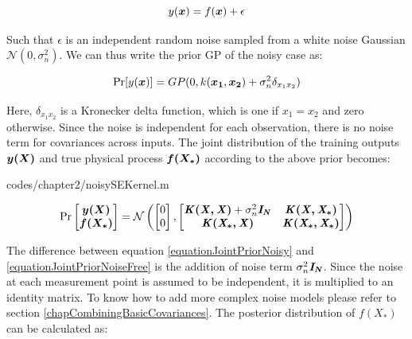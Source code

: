 \begin{equation}\label{eqNoiseEquation}
y(\boldsymbol{x}) = f(\boldsymbol{x}) + \epsilon
\end{equation}

Such that $\epsilon$ is an independent random noise sampled from a white noise Gaussian $\mathcal{N}(0, \sigma_{n}^{2})$. We can thus write the prior GP of the noisy case as:

\begin{equation}\label{equationMeanZeroGPNoisydefinition}
\Pr[y(\boldsymbol{x})] = GP(0 , k(\boldsymbol{x_1}, \boldsymbol{x_2}) + \sigma^{2}_{n}\delta_{x_{1}x_{2}})
\end{equation}

Here, $\delta_{x_{1}x_{2}}$ is a Kronecker delta function, which is one if $x_1 = x_2$ and zero otherwise. Since the noise is independent for each observation, there is no noise term for covariances across inputs. The joint distribution of the training outputs $\boldsymbol{y(X)}$ and true physical process $\boldsymbol{f(X_{*})}$ according to the above prior becomes:

\begin{mdframed}[hidealllines=true,backgroundcolor=lightgray!20]

                    {codes/chapter2/noisySEKernel.m}
\end{mdframed}

\begin{equation}\label{equationJointPriorNoisy}
\Pr\left [ \begin{matrix}
\boldsymbol{y(X)}
\\ \boldsymbol{f(X_{*})}
\end{matrix} \right ]
= 
\mathcal{N}\left (
\left [ \begin{matrix}
0
\\ 0

\end{matrix} \right ] , \left [ \begin{matrix}
\bm{\mathit{K(X, X)}} + \sigma^{2}_{n}\bm{\mathit{I_N}} & \bm{\mathit{K(X, X_{*})}}\\ 
\bm{\mathit{K(X_{*}, X)}} & \bm{\mathit{K(X_{*}, X_{*})}}
\end{matrix} \right ] 
\right )
\end{equation}

The difference between equation \ref{equationJointPriorNoisy} and \ref{equationJointPriorNoiseFree} is the addition of noise term $\sigma^{2}_{n}\bm{\mathit{I_N}}$. Since the noise at each measurement point is assumed to be independent, it is multiplied to an identity matrix. To know how to add more complex noise models please refer to section \ref{chapCombiningBasicCovariances}. The posterior distribution of $f(X_{*})$ can be calculated as:

